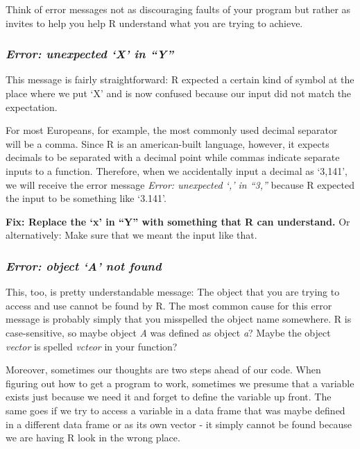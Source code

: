 \documentclass[
]{book}
\begin{document}
Think of error messages not as discouraging faults of your program but rather as invites to help you help R understand what you are trying to achieve.

\subsubsection*{\texorpdfstring{\emph{Error: unexpected `X' in ``Y''}}{Error: unexpected `X' in ``Y''}}\label{error-unexpected-x-in-y}

This message is fairly straightforward:
R expected a certain kind of symbol at the place where we put `X' and is now confused because our input did not match the expectation.

For most Europeans, for example, the most commonly used decimal separator will be a comma.
Since R is an american-built language, however, it expects decimals to be separated with a decimal point while commas indicate separate inputs to a function.
Therefore, when we accidentally input a decimal as `3,141', we will receive the error message \emph{Error: unexpected `,' in ``3,''} because R expected the input to be something like `3.141'.

\textbf{Fix: Replace the `x' in ``Y'' with something that R can understand.} Or alternatively: Make sure that we meant the input like that.

\subsubsection*{\texorpdfstring{\emph{Error: object `A' not found}}{Error: object `A' not found}}\label{error-object-a-not-found}

This, too, is pretty understandable message:
The object that you are trying to access and use cannot be found by R.
The most common cause for this error message is probably simply that you misspelled the object name somewhere.
R is case-sensitive, so maybe object \emph{A} was defined as object \emph{a}?
Maybe the object \emph{vector} is spelled \emph{vcteor} in your function?

Moreover, sometimes our thoughts are two steps ahead of our code.
When figuring out how to get a program to work, sometimes we presume that a variable exists just because we need it and forget to define the variable up front.
The same goes if we try to access a variable in a data frame that was maybe defined in a different data frame or as its own vector - it simply cannot be found because we are having R look in the wrong place.
\end{document}

